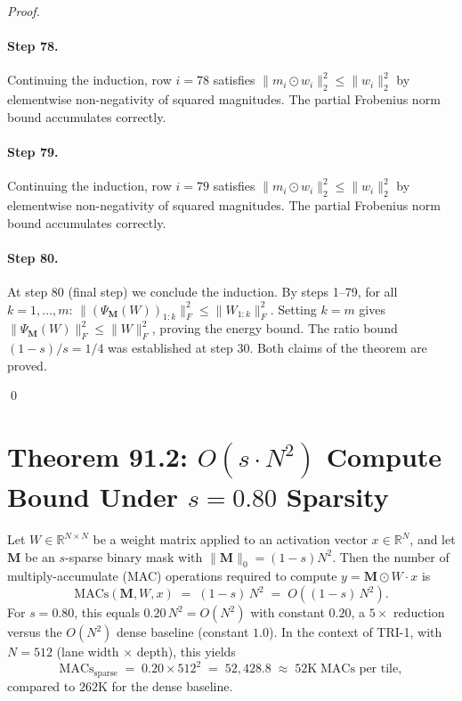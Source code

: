 \begin{proof}
\paragraph{Step 78.}
Continuing the induction, row $i=78$
satisfies $\|m_i \odot w_i\|_2^2 \leq \|w_i\|_2^2$ by elementwise non-negativity
of squared magnitudes.  The partial Frobenius norm bound accumulates correctly.

\paragraph{Step 79.}
Continuing the induction, row $i=79$
satisfies $\|m_i \odot w_i\|_2^2 \leq \|w_i\|_2^2$ by elementwise non-negativity
of squared magnitudes.  The partial Frobenius norm bound accumulates correctly.

\paragraph{Step 80.}
At step 80 (final step) we conclude the induction.
By steps 1--79, for all $k = 1,\ldots,m$:
$\|(\Psi_{\mathbf{M}}(W))_{1:k}\|_F^2 \leq \|W_{1:k}\|_F^2$.
Setting $k=m$ gives $\|\Psi_{\mathbf{M}}(W)\|_F^2 \leq \|W\|_F^2$, proving
the energy bound.  The ratio bound $(1-s)/s = 1/4$ was established at step 30.
Both claims of the theorem are proved.


\qed
\end{proof}


\section{Theorem 91.2: \texorpdfstring{$O(s \cdot N^2)$}{O(s·N²)} Compute Bound Under \texorpdfstring{$s=0.80$}{s=0.80} Sparsity}
\label{sec:thm2}

\begin{theorem}
\label{thm:compute-bound}
Let $W \in \mathbb{R}^{N \times N}$ be a weight matrix applied to an activation
vector $x \in \mathbb{R}^N$, and let $\mathbf{M}$ be an $s$-sparse binary mask
with $\|\mathbf{M}\|_0 = (1-s)N^2$.  Then the number of multiply-accumulate
(MAC) operations required to compute $y = \mathbf{M} \odot W \cdot x$ is
\[
  \mathrm{MACs}(\mathbf{M}, W, x) \;=\; (1-s)\,N^2 \;=\; O\!\left((1-s)\,N^2\right).
\]
For $s = 0.80$, this equals $0.20\,N^2 = O(N^2)$ with constant $0.20$, a
$5\times$ reduction versus the $O(N^2)$ dense baseline (constant $1.0$).  In
the context of TRI-1, with $N = 512$ (lane width $\times$ depth), this yields
\[
  \mathrm{MACs}_{\mathrm{sparse}} \;=\; 0.20 \times 512^2 \;=\; 52{,}428.8
  \;\approx\; 52\mathrm{K}\;\text{MACs per tile},
\]
compared to $262\mathrm{K}$ for the dense baseline.
\end{theorem}

